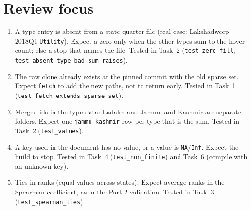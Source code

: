 \documentclass[10pt,a4paper]{article}
\newcommand{\f}[1]{\texttt{#1}}
\begin{document}
\section*{Review focus}
\begin{enumerate}
\item A type entry is absent from a state-quarter file (real case: Lakshadweep 2018Q1 \f{Utility}). Expect a
      zero only when the other types sum to the hover count; else a stop that names the file.
      Tested in Task~2 (\f{test\_zero\_fill}, \f{test\_absent\_type\_bad\_sum\_raises}).
\item The raw clone already exists at the pinned commit with the old sparse set. Expect \f{fetch} to add the new
      paths, not to return early. Tested in Task~1 (\f{test\_fetch\_extends\_sparse\_set}).
\item Merged ids in the type data: Ladakh and Jammu and Kashmir are separate folders. Expect one
      \f{jammu\_kashmir} row per type that is the sum. Tested in Task~2 (\f{test\_values}).
\item A key used in the document has no value, or a value is \f{NA}/\f{Inf}. Expect the build to stop. Tested
      in Task~4 (\f{test\_non\_finite}) and Task~6 (compile with an unknown key).
\item Ties in ranks (equal values across states). Expect average ranks in the Spearman coefficient, as in the
      Part 2 validation. Tested in Task~3 (\f{test\_spearman\_ties}).
\end{enumerate}
\end{document}
